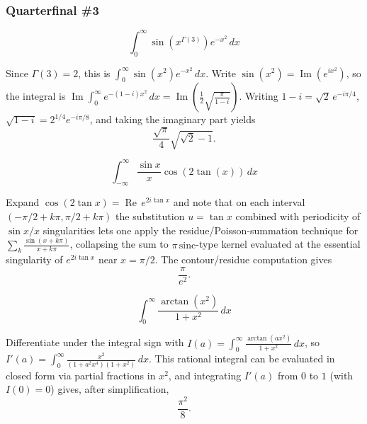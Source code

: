 \subsubsection*{Quarterfinal \#3}
\begin{questions}

\question
\[
\int_0^{\infty} \sin\!\left(x^{\Gamma(3)}\right)e^{-x^2} \, dx
\]
\begin{solution}
Since $\Gamma(3)=2$, this is $\int_0^\infty \sin(x^2)e^{-x^2}\,dx$. Write $\sin(x^2)=\operatorname{Im}(e^{ix^2})$, so the integral is $\operatorname{Im}\int_0^\infty e^{-(1-i)x^2}\,dx=\operatorname{Im}\left(\frac{1}{2}\sqrt{\frac{\pi}{1-i}}\right)$. Writing $1-i=\sqrt2\,e^{-i\pi/4}$, $\sqrt{1-i}=2^{1/4}e^{-i\pi/8}$, and taking the imaginary part yields
\[
\frac{\sqrt\pi}{4}\sqrt{\sqrt2-1}.
\]
\end{solution}

\question
\[
\int_{-\infty}^{\infty} \frac{\sin x}{x}\cos(2\tan(x)) \, dx
\]
\begin{solution}
Expand $\cos(2\tan x)=\operatorname{Re}\,e^{2i\tan x}$ and note that on each interval $(-\pi/2+k\pi,\pi/2+k\pi)$ the substitution $u=\tan x$ combined with periodicity of $\sin x/x$ singularities lets one apply the residue/Poisson-summation technique for $\sum_k \frac{\sin(x+k\pi)}{x+k\pi}$, collapsing the sum to $\pi\,\mathrm{sinc}$-type kernel evaluated at the essential singularity of $e^{2i\tan x}$ near $x=\pi/2$. The contour/residue computation gives
\[
\frac{\pi}{e^{2}}.
\]
\end{solution}

\question
\[
\int_0^{\infty} \frac{\arctan(x^2)}{1+x^2} \, dx
\]
\begin{solution}
Differentiate under the integral sign with $I(a)=\int_0^\infty \frac{\arctan(ax^2)}{1+x^2}\,dx$, so $I'(a)=\int_0^\infty \frac{x^2}{(1+a^2x^4)(1+x^2)}\,dx$. This rational integral can be evaluated in closed form via partial fractions in $x^2$, and integrating $I'(a)$ from $0$ to $1$ (with $I(0)=0$) gives, after simplification,
\[
\frac{\pi^2}{8}.
\]
\end{solution}

\end{questions}

